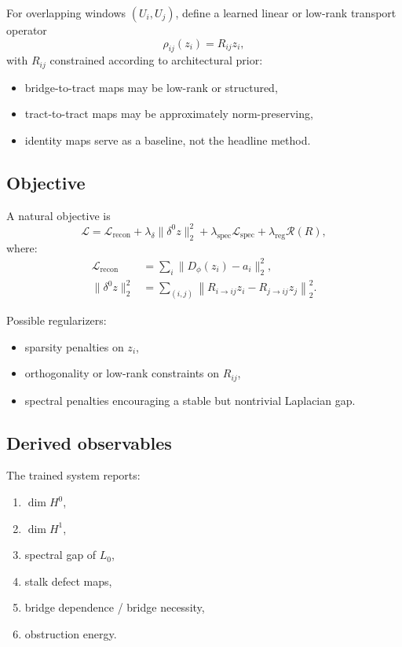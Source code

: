 \documentclass[11pt]{article}
\begin{document}
For overlapping windows $(U_i,U_j)$, define a learned linear or low-rank transport operator
\[
\rho_{ij}(z_i) = R_{ij} z_i,
\]
with $R_{ij}$ constrained according to architectural prior:
\begin{itemize}[leftmargin=1.5em]
    \item bridge-to-tract maps may be low-rank or structured,
    \item tract-to-tract maps may be approximately norm-preserving,
    \item identity maps serve as a baseline, not the headline method.
\end{itemize}

\subsection{Objective}

A natural objective is
\[
\mathcal{L}
=
\mathcal{L}_{\mathrm{recon}}
+
\lambda_{\delta}\|\delta^0 z\|_2^2
+
\lambda_{\mathrm{spec}}\mathcal{L}_{\mathrm{spec}}
+
\lambda_{\mathrm{reg}}\mathcal{R}(R),
\]
where:
\begin{align*}
\mathcal{L}_{\mathrm{recon}} &=
\sum_i \|D_\phi(z_i) - a_i\|_2^2,\\
\|\delta^0 z\|_2^2 &=
\sum_{(i,j)}
\left\|
R_{i\to ij} z_i - R_{j\to ij} z_j
\right\|_2^2.
\end{align*}

Possible regularizers:
\begin{itemize}[leftmargin=1.5em]
    \item sparsity penalties on $z_i$,
    \item orthogonality or low-rank constraints on $R_{ij}$,
    \item spectral penalties encouraging a stable but nontrivial Laplacian gap.
\end{itemize}

\subsection{Derived observables}

The trained system reports:
\begin{enumerate}[leftmargin=1.5em]
    \item $\dim H^0$,
    \item $\dim H^1$,
    \item spectral gap of $L_0$,
    \item stalk defect maps,
    \item bridge dependence / bridge necessity,
    \item obstruction energy.
\end{enumerate}
\end{document}
